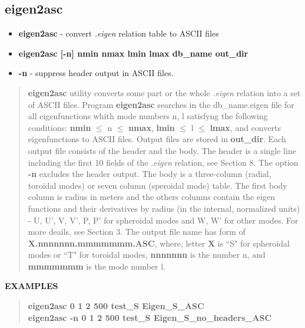 \subsection{eigen2asc}
\vred
\begin{itemize}
\vred
\item[] {\bf eigen2asc} - convert {\it .eigen} relation table to ASCII files
\vred
\end{itemize}
\vred
{}
\vred
\begin{itemize}
\vred
\item[] {\bf eigen2asc [-n] nmin nmax lmin lmax db\_name out\_dir}
\vred
\end{itemize}
\vred
{}
\vred
\begin{itemize}
\vred
\item[] {\bf -n} - suppress header output in ASCII files.
\vred
\end{itemize}
\vred
{}
\vred
\begin{quote}
\vred
{\bf eigen2asc} utility converts some part or the whole {\it .eigen} 
relation into a set of ASCII files. Program {\bf eigen2asc} searches 
in the db\_name.eigen file for all eigenfunctions whith mode numbers 
n, l satisfyng the following conditions: {\bf nmin} $\le$ n $\le$ 
{\bf nmax}, {\bf lmin} $\le$ l $\le$ {\bf lmax}, and converts 
eigenfunctions to ASCII files. Output files are stored in 
{\bf out\_dir}. Each output file  consists of the header and the body.
The header is a single line including the first 10 fields of the {\it .eigen}
relation, see  Section 8. The option {\bf -n} excludes the header 
output. The body is a three-column (radial, toroidal modes) or seven 
column (speroidal mode) table. The first body column is radius in 
meters and the others columns contain the eigen functions and their 
derivatives by radius (in the internal, normalized units) - 
U, U', V, V', P, P'   for spheroidal modes and W, W' for other modes. 
For more deails, see Section 3.  The output file name has form of 
{\bf X.nnnnnnn.mmmmmmm.ASC}, where, letter {\bf X} is ``S" for 
spheroidal modes or ``T" for toroidal modes, {\bf nnnnnnn}
is the number n, and {\bf mmmmmmm} is the mode number l.
\end{quote}
\vred
{\bf EXAMPLES}
\vred
\begin{quote}
\vred
{\bf eigen2asc 0 1 2 500 test\_S Eigen\_S\_ASC \\
eigen2asc -n 0 1 2 500 test\_S Eigen\_S\_no\_headers\_ASC }
\end{quote}
